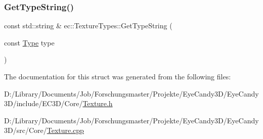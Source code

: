 \subsubsection{\texorpdfstring{Get\+Type\+String()}{GetTypeString()}}
{\footnotesize\ttfamily const std\+::string \& ec\+::\+Texture\+Types\+::\+Get\+Type\+String (\begin{DoxyParamCaption}\item[{const \mbox{\hyperlink{structec_1_1_texture_types_aff67825b98dd1edd7e4783350e866202}{Type}}}]{type }\end{DoxyParamCaption})\hspace{0.3cm}{\ttfamily [static]}}



The documentation for this struct was generated from the following files\+:\begin{DoxyCompactItemize}
\item 
D\+:/\+Library/\+Documents/\+Job/\+Forschungsmaster/\+Projekte/\+Eye\+Candy3\+D/\+Eye\+Candy3\+D/include/\+E\+C3\+D/\+Core/\mbox{\hyperlink{_texture_8h}{Texture.\+h}}\item 
D\+:/\+Library/\+Documents/\+Job/\+Forschungsmaster/\+Projekte/\+Eye\+Candy3\+D/\+Eye\+Candy3\+D/src/\+Core/\mbox{\hyperlink{_texture_8cpp}{Texture.\+cpp}}\end{DoxyCompactItemize}
